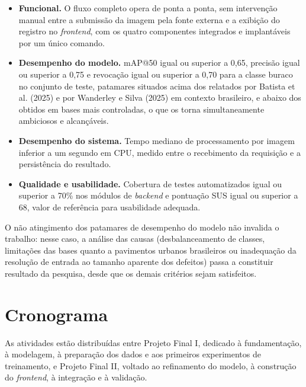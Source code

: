 \documentclass[12pt]{article}
\begin{document}
\begin{itemize}
  \item \textbf{Funcional.} O fluxo completo opera de ponta a ponta, sem
    intervenção manual entre a submissão da imagem pela fonte externa e a
    exibição do registro no \emph{frontend}, com os quatro componentes
    integrados e implantáveis por um único comando.
  \item \textbf{Desempenho do modelo.} mAP@50 igual ou superior a 0,65,
    precisão igual ou superior a 0,75 e revocação igual ou superior a
    0,70 para a classe buraco no conjunto de teste, patamares situados
    acima dos relatados por Batista et al. (2025) e por Wanderley e Silva
    (2025) em contexto brasileiro, e abaixo dos obtidos em bases mais
    controladas, o que os torna simultaneamente ambiciosos e
    alcançáveis.
  \item \textbf{Desempenho do sistema.} Tempo mediano de processamento
    por imagem inferior a um segundo em CPU, medido entre o recebimento
    da requisição e a persistência do resultado.
  \item \textbf{Qualidade e usabilidade.} Cobertura de testes
    automatizados igual ou superior a 70\% nos módulos de \emph{backend}
    e pontuação SUS igual ou superior a 68, valor de referência para
    usabilidade adequada.
\end{itemize}

O não atingimento dos patamares de desempenho do modelo não invalida o
trabalho: nesse caso, a análise das causas (desbalanceamento de classes,
limitações das bases quanto a pavimentos urbanos brasileiros ou
inadequação da resolução de entrada ao tamanho aparente dos defeitos)
passa a constituir resultado da pesquisa, desde que os demais critérios
sejam satisfeitos.

\section{Cronograma}
\label{sec:cronograma}

As atividades estão distribuídas entre Projeto Final I, dedicado à
fundamentação, à modelagem, à preparação dos dados e aos primeiros
experimentos de treinamento, e Projeto Final II, voltado ao refinamento
do modelo, à construção do \emph{frontend}, à integração e à validação.


\newcommand{\x}{$\bullet$}
\end{document}
